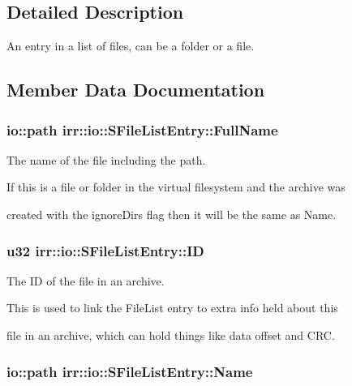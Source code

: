 \subsection{Detailed Description}
An entry in a list of files, can be a folder or a file. 

\subsection{Member Data Documentation}
\hypertarget{structirr_1_1io_1_1_s_file_list_entry_a2aaa0466388e66015138a765a1c9ecab}{
\subsubsection[{Full\-Name}]{\setlength{\rightskip}{0pt plus 5cm}io\-::path irr\-::io\-::\-S\-File\-List\-Entry\-::\-Full\-Name}}\label{structirr_1_1io_1_1_s_file_list_entry_a2aaa0466388e66015138a765a1c9ecab}


The name of the file including the path. 

\begin{DoxyVerb}If this is a file or folder in the virtual filesystem and the archive was
\end{DoxyVerb}
 created with the ignore\-Dirs flag then it will be the same as Name. \hypertarget{structirr_1_1io_1_1_s_file_list_entry_ac5da2528c39734795714ea8e21c0d6ed}{
\subsubsection[{I\-D}]{\setlength{\rightskip}{0pt plus 5cm}u32 irr\-::io\-::\-S\-File\-List\-Entry\-::\-I\-D}}\label{structirr_1_1io_1_1_s_file_list_entry_ac5da2528c39734795714ea8e21c0d6ed}


The I\-D of the file in an archive. 

\begin{DoxyVerb}This is used to link the FileList entry to extra info held about this
\end{DoxyVerb}
 file in an archive, which can hold things like data offset and C\-R\-C. \hypertarget{structirr_1_1io_1_1_s_file_list_entry_a1d997e72e517823903bd7205ba97cc8c}{
\subsubsection[{Name}]{\setlength{\rightskip}{0pt plus 5cm}io\-::path irr\-::io\-::\-S\-File\-List\-Entry\-::\-Name}}\label{structirr_1_1io_1_1_s_file_list_entry_a1d997e72e517823903bd7205ba97cc8c}


